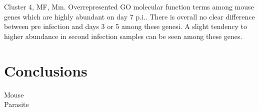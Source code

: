 \documentclass{article}
\begin{document}
  Cluster 4, MF, Mm.
  Overrepresented GO molecular function terms among mouse genes which are highly abundant on day 7 p.i.. 
  There is overall no clear difference between pre infection and days 3 or 5 among these genesi. A slight
  tendency to higher abundance in second infection samples can be seen among these genes.\\
  


\section{Conclusions}

Mouse\\

Parasite\\



\end{document}
